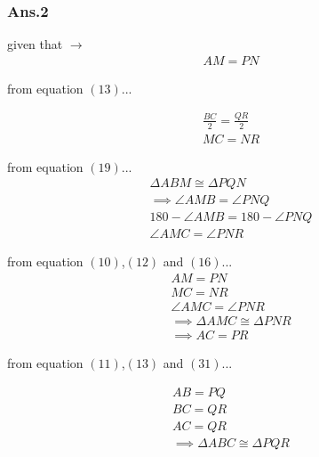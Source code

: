 \documentclass{beamer}
\begin{document}
       	\begin{frame}
       		\frametitle{Ans.2}
       		\begin{multicols}{2}
       		given that $\to$\\
       		\begin{align}
       			AM = PN
       		\end{align}
       		
       		from equation $\left(13\right)$...
       		
       		\begin{align}
       			\frac{BC}{2} = \frac{QR}{2} \\
       			MC = NR
       		\end{align}	
       
     		from equation $\left(19\right)$...
     	\begin{align}
     		\Delta ABM \cong \Delta PQN 
     		\\
     		\implies \angle AMB = \angle PNQ
     		\\
     		180 - \angle AMB = 180 -  \angle PNQ
     		\\
     		\angle AMC = \angle PNR
     	\end{align}
     	\end{multicols}
     \end{frame}
     \begin{frame}
     	\begin{multicols}{2}
     	from equation $\left(10\right)$,$\left(12\right)$ and $\left(16\right)$...
     	\begin{align}
     		AM = PN
     		\\
     		MC = NR
     		\\
     		\angle AMC = \angle PNR
     		\\
     		\implies  \Delta AMC \cong \Delta PNR
     		\\
     		\implies AC = PR
     	\end{align}
     	
 
 		from equation $\left(11\right)$,$\left(13\right)$ and $\left(31\right)$...
 	
 		\begin{align}
 			AB = PQ\\
 			BC = QR\\
 			AC = QR\\
 			\implies  \Delta ABC \cong \Delta PQR
 		\end{align}
 		\end{multicols}
 	\end{frame}
\end{document}
